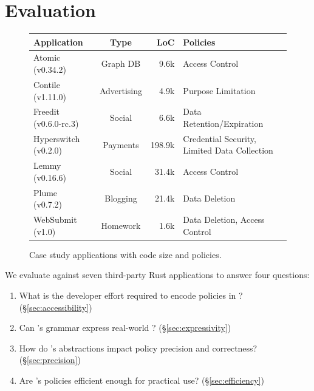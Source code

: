 \chapter{Evaluation}

\begin{figure}
    \centering
    \small
     \begin{tabular}{l|c|r|l}
       \bf Application        & \bf Type    & \bf LoC & \bf Policies   \\
      \hline
       Atomic~\cite{atomic} (v0.34.2)       & Graph DB    & 9.6k   & Access Control                                 \\
       Contile~\cite{contile} (v1.11.0)     & Advertising & 4.9k     & Purpose Limitation                           \\
       Freedit~\cite{freedit} (v0.6.0-rc.3) & Social      & 6.6k     & Data Retention/Expiration                     \\
       Hyperswitch~\cite{hyperswitch} (v0.2.0)   & Payments    & 198.9k     & Credential Security, Limited Data Collection  \\
       Lemmy~\cite{lemmy} (v0.16.6)        & Social      & 31.4k   & Access Control                               \\
       Plume~\cite{plume} (v0.7.2)         & Blogging    & 21.4k   & Data Deletion                                \\
       WebSubmit~\cite{websubmit} (v1.0)       & Homework    & 1.6k    & Data Deletion, Access Control     \\
    \end{tabular}
    \caption{Case study applications with code size and policies.}
    \label{f:apps}
   \end{figure}

We evaluate \syslang{} against seven third-party Rust applications to answer four questions:
%
\begin{enumerate}[nosep]
    \item What is the developer effort required to encode policies in \syslang? (\S\ref{sec:accessibility})
    \item Can \syslang's grammar express real-world \policies? (\S\ref{sec:expressivity})
    \item How do \syslang's abstractions impact policy precision and correctness?(\S\ref{sec:precision})
    \item Are \syslang's policies efficient enough for practical use? (\S\ref{sec:efficiency})
\end{enumerate}
%

